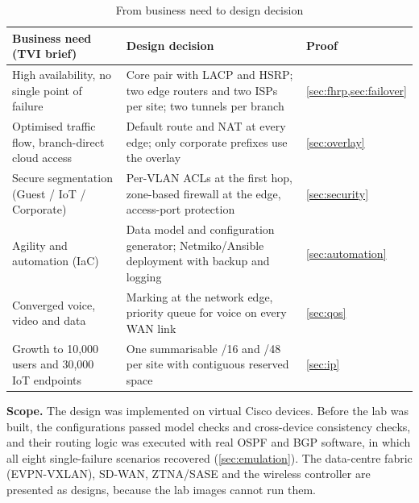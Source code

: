 \begin{table}[H]\centering\small
\caption{From business need to design decision}\label{tab:needs}
\begin{tabularx}{\textwidth}{@{}>{\raggedright\arraybackslash}p{4.2cm} Y l@{}}
\toprule
\textbf{Business need (TVI brief)} & \textbf{Design decision} & \textbf{Proof} \\
\midrule
High availability, no single point of failure &
  Core pair with LACP and HSRP; two edge routers and two ISPs per site; two tunnels per branch &
  \cref{sec:fhrp,sec:failover} \\
Optimised traffic flow, branch-direct cloud access &
  Default route and NAT at every edge; only corporate prefixes use the overlay &
  \cref{sec:overlay} \\
Secure segmentation (Guest / IoT / Corporate) &
  Per-VLAN ACLs at the first hop, zone-based firewall at the edge, access-port protection &
  \cref{sec:security} \\
Agility and automation (IaC) &
  Data model and configuration generator; Netmiko/Ansible deployment with backup and logging &
  \cref{sec:automation} \\
Converged voice, video and data &
  Marking at the network edge, priority queue for voice on every WAN link &
  \cref{sec:qos} \\
Growth to 10{,}000 users and 30{,}000 IoT endpoints &
  One summarisable /16 and /48 per site with contiguous reserved space &
  \cref{sec:ip} \\
\bottomrule
\end{tabularx}
\end{table}

\textbf{Scope.} The design was implemented on \FactNumDevices{} virtual Cisco devices. Before the lab was
built, the configurations passed \FactTestsModel{} model checks and \FactTestsConfigs{} cross-device
consistency checks, and their routing logic was executed with real OSPF and BGP software, in which all
eight single-failure scenarios recovered (\cref{sec:emulation}). The data-centre fabric (EVPN-VXLAN),
SD-WAN, ZTNA/SASE and the wireless controller are presented as designs, because the lab images cannot run
them.
